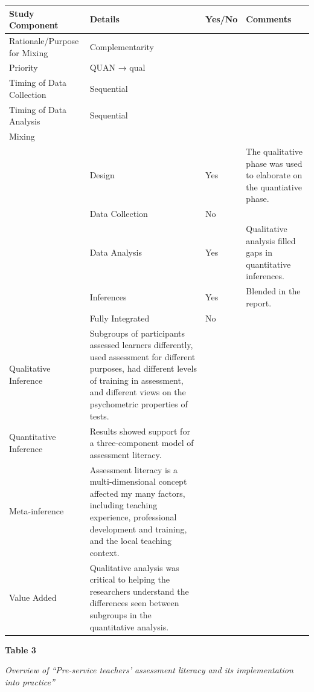 \documentclass[
]{book}
\begin{document}
\begin{longtable}[]{@{}
  >{\raggedright\arraybackslash}p{}
  >{\raggedright\arraybackslash}p{}
  >{\raggedright\arraybackslash}p{}
  >{\raggedright\arraybackslash}p{}@{}}
\toprule
Study Component & Details & Yes/No & Comments \\
\midrule
\endhead
Rationale/Purpose for Mixing & Complementarity & & \\
Priority & QUAN → qual & & \\
Timing of Data Collection & Sequential & & \\
Timing of Data Analysis & Sequential & & \\
Mixing & & & \\
& Design & Yes & The qualitative phase was used to elaborate on the quantiative phase. \\
& Data Collection & No & \\
& Data Analysis & Yes & Qualitative analysis filled gaps in quantitative inferences. \\
& Inferences & Yes & Blended in the report. \\
& Fully Integrated & No & \\
Qualitative Inference & Subgroups of participants assessed learners differently, used assessment for different purposes, had different levels of training in assessment, and different views on the psychometric properties of tests. & & \\
Quantitative Inference & Results showed support for a three-component model of assessment literacy. & & \\
Meta-inference & Assessment literacy is a multi-dimensional concept affected my many factors, including teaching experience, professional development and training, and the local teaching context. & & \\
Value Added & Qualitative analysis was critical to helping the researchers understand the differences seen between subgroups in the quantitative analysis. & & \\
\bottomrule
\end{longtable}

\textbf{Table 3}

\emph{Overview of ``Pre-service teachers' assessment literacy and its implementation into practice'' \citep{ogan-bekirogluPreServiceTeachers2014}}
\end{document}
